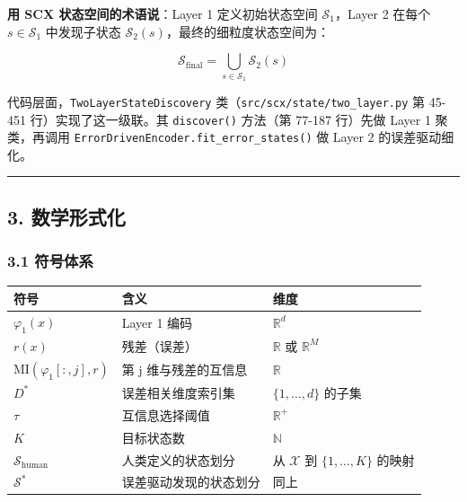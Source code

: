 \documentclass[
  12pt,
]{ctexart}
\begin{document}
\textbf{用 SCX 状态空间的术语说}：Layer 1 定义初始状态空间
\(\mathcal{S}_1\)，Layer 2 在每个 \(s \in \mathcal{S}_1\) 中发现子状态
\(\mathcal{S}_2(s)\)，最终的细粒度状态空间为：

\[\mathcal{S}_{\text{final}} = \bigcup_{s \in \mathcal{S}_1} \mathcal{S}_2(s)\]

代码层面，\texttt{TwoLayerStateDiscovery}
类（\texttt{src/scx/state/two\_layer.py} 第 45-451
行）实现了这一级联。其 \texttt{discover()} 方法（第 77-187 行）先做
Layer 1 聚类，再调用 \texttt{ErrorDrivenEncoder.fit\_error\_states()} 做
Layer 2 的误差驱动细化。

\begin{center}\rule{0.5\linewidth}{0.5pt}\end{center}

\subsection{3. 数学形式化}\label{ux6570ux5b66ux5f62ux5f0fux5316}

\subsubsection{3.1 符号体系}\label{ux7b26ux53f7ux4f53ux7cfb}

\begin{longtable}[]{@{}
  >{\raggedright\arraybackslash}p{}
  >{\raggedright\arraybackslash}p{}
  >{\raggedright\arraybackslash}p{}@{}}
\toprule\noalign{}
\begin{minipage}[b]{\linewidth}\raggedright
符号
\end{minipage} & \begin{minipage}[b]{\linewidth}\raggedright
含义
\end{minipage} & \begin{minipage}[b]{\linewidth}\raggedright
维度
\end{minipage} \\
\midrule\noalign{}
\endhead
\bottomrule\noalign{}
\endlastfoot
\(\varphi_1(x)\) & Layer 1 编码 & \(\mathbb{R}^d\) \\
\(r(x)\) & 残差（误差） & \(\mathbb{R}\) 或 \(\mathbb{R}^M\) \\
\(\text{MI}(\varphi_1[:, j], r)\) & 第 j 维与残差的互信息 &
\(\mathbb{R}\) \\
\(D^*\) & 误差相关维度索引集 & \(\{1,\dots,d\}\) 的子集 \\
\(\tau\) & 互信息选择阈值 & \(\mathbb{R}^+\) \\
\(K\) & 目标状态数 & \(\mathbb{N}\) \\
\(\mathcal{S}_{\text{human}}\) & 人类定义的状态划分 & 从 \(\mathcal{X}\)
到 \(\{1,\dots,K\}\) 的映射 \\
\(\mathcal{S}^*\) & 误差驱动发现的状态划分 & 同上 \\
\end{longtable}
\end{document}
